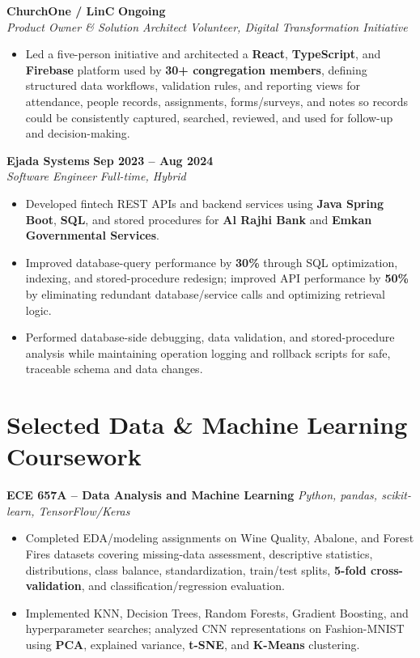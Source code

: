 \documentclass[letterpaper,11pt]{article}
\newcommand{\resumeSubheading}[4]{
  \textbf{#1} \hfill \textbf{#2} \\
  \textit{#3} \hfill \textit{#4} \\
}
\newcommand{\resumeProjectHeading}[2]{
  \textbf{#1} \hfill \textit{#2} \\
}
\begin{document}
\resumeSubheading
{ChurchOne / LinC}{Ongoing}
{Product Owner \& Solution Architect}{Volunteer, Digital Transformation Initiative}
\begin{itemize}
    \item Led a five-person initiative and architected a \textbf{React}, \textbf{TypeScript}, and \textbf{Firebase} platform used by \textbf{30+ congregation members}, defining structured data workflows, validation rules, and reporting views for attendance, people records, assignments, forms/surveys, and notes so records could be consistently captured, searched, reviewed, and used for follow-up and decision-making.
\end{itemize}

\newpage
\resumeSubheading
{Ejada Systems}{Sep 2023 -- Aug 2024}
{Software Engineer}{Full-time, Hybrid}
\begin{itemize}
    \item Developed fintech REST APIs and backend services using \textbf{Java Spring Boot}, \textbf{SQL}, and stored procedures for \textbf{Al Rajhi Bank} and \textbf{Emkan Governmental Services}.
    \item Improved database-query performance by \textbf{30\%} through SQL optimization, indexing, and stored-procedure redesign; improved API performance by \textbf{50\%} by eliminating redundant database/service calls and optimizing retrieval logic.
    \item Performed database-side debugging, data validation, and stored-procedure analysis while maintaining operation logging and rollback scripts for safe, traceable schema and data changes.
\end{itemize}

\section{Selected Data \& Machine Learning Coursework}

\resumeProjectHeading
{ECE 657A -- Data Analysis and Machine Learning}{Python, pandas, scikit-learn, TensorFlow/Keras}
\begin{itemize}
    \item Completed EDA/modeling assignments on Wine Quality, Abalone, and Forest Fires datasets covering missing-data assessment, descriptive statistics, distributions, class balance, standardization, train/test splits, \textbf{5-fold cross-validation}, and classification/regression evaluation.
    \item Implemented KNN, Decision Trees, Random Forests, Gradient Boosting, and hyperparameter searches; analyzed CNN representations on Fashion-MNIST using \textbf{PCA}, explained variance, \textbf{t-SNE}, and \textbf{K-Means} clustering.
\end{itemize}
\end{document}
